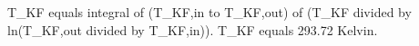 T_KF equals integral of (T_KF,in to T_KF,out) of (T_KF divided by ln(T_KF,out divided by T_KF,in)).  
T_KF equals 293.72 Kelvin.